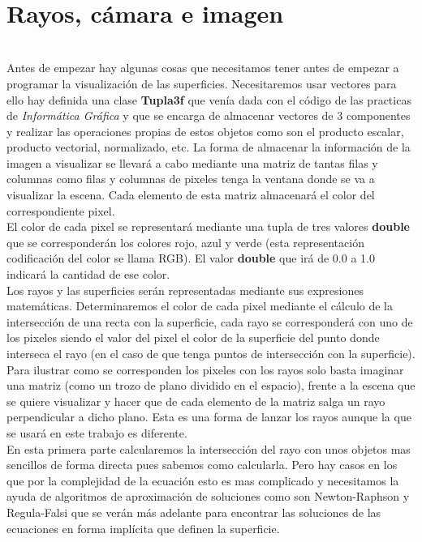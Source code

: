  



${ }$\\
\section{Rayos, cámara e imagen}
${ }$\\

Antes de empezar hay algunas cosas que necesitamos tener antes de empezar a programar la visualización de las superficies. Necesitaremos usar vectores para ello hay definida una clase \textbf{Tupla3f} que venía dada con el código de las practicas de \textit{Informática Gráfica} y que se encarga de almacenar vectores de 3 componentes y realizar las operaciones propias de estos objetos como son el producto escalar, producto vectorial, normalizado, etc. La forma de almacenar la información de la imagen a visualizar se llevará a cabo mediante una matriz de tantas filas y columnas como filas y columnas de pixeles tenga la ventana donde se va a visualizar la escena. Cada elemento de esta matriz almacenará el color del correspondiente pixel.
	${ }$\\	
	
El color de cada pixel se representará mediante una tupla de tres valores \textbf{double} que se corresponderán los colores rojo, azul y verde (esta representación codificación del color se llama RGB). El valor \textbf{double} que irá de 0.0 a 1.0 indicará la cantidad de ese color.
	${ }$\\	
	
Los rayos y las superficies serán representadas mediante sus expresiones matemáticas. Determinaremos el color de cada pixel mediante el cálculo de la intersección de una recta con la superficie, cada rayo se corresponderá con uno de los pixeles siendo el valor del pixel el color de la superficie del punto donde interseca el rayo (en el caso de que tenga puntos de intersección con la superficie). Para ilustrar como se corresponden los pixeles con los rayos solo basta imaginar una matriz (como un trozo de plano dividido en el espacio), frente a la escena que se quiere visualizar y hacer que de cada elemento de la matriz salga un rayo perpendicular a dicho plano. Esta es una forma de lanzar los rayos aunque la que se usará en este trabajo es diferente.
	${ }$\\	
	
En esta primera parte calcularemos la intersección del rayo con unos objetos mas sencillos de forma directa pues sabemos como calcularla. Pero hay casos en los que por la complejidad de la ecuación esto es mas complicado y necesitamos la ayuda de algoritmos de aproximación de soluciones como son Newton-Raphson y Regula-Falsi que se verán más adelante para encontrar las soluciones de las ecuaciones en forma implícita que definen la superficie.
${ }$\\
	
